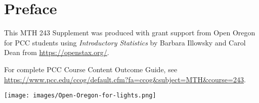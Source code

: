 \chapter{Preface}

This MTH 243 Supplement was produced with grant support from 
Open Oregon 
for PCC students using 
\emph{Introductory Statistics} 
by Barbara Illowsky and Carol Dean
from
\url{https://openstax.org/}.

For complete PCC Course Content Outcome Guide, see \url{https://www.pcc.edu/ccog/default.cfm?fa=ccog&subject=MTH&course=243}.

\begin{center}
\texttt{[image: images/Open-Oregon-for-lights.png]}
\end{center}

